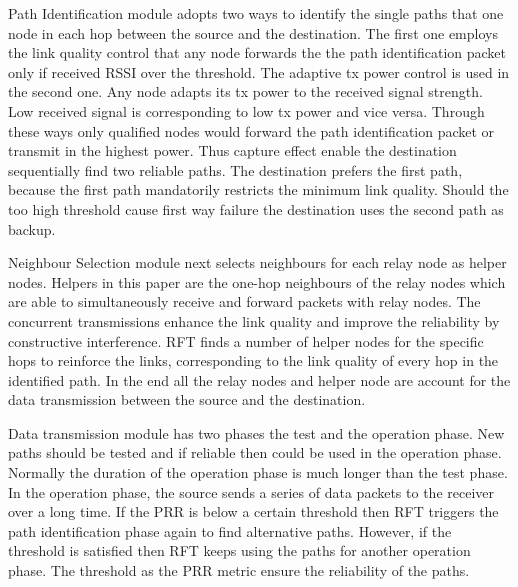 \documentclass[conference]{IEEEtran}
\begin{document}
Path Identification module adopts two ways to identify the single paths that one node in each hop between the source and the destination. The first one employs the link quality control that any node forwards the the path identification packet only if received RSSI over the threshold. The adaptive tx power control is used in the second one. Any node adapts its tx power to the received signal strength. Low received signal is corresponding to low tx power and vice versa. Through these ways only qualified nodes would forward the path identification packet or transmit in the highest power. Thus capture effect enable the destination sequentially find two reliable paths. The destination prefers the first path, because the first path mandatorily restricts the minimum link quality. Should the too high threshold cause first way failure the destination uses the second path as backup.

Neighbour Selection module next selects neighbours for each relay node as helper nodes. Helpers in this paper are the one-hop neighbours of the relay nodes which are able to simultaneously receive and forward packets with relay nodes. The concurrent transmissions enhance the link quality and improve the reliability by constructive interference. RFT finds a number of helper nodes for the specific hops to reinforce the links, corresponding to the link quality of every hop in the identified path. In the end all the relay nodes and helper node are account for the data transmission between the source and the destination.

Data transmission module has two phases the test and the operation phase. New paths should be tested and if reliable then could be used in the operation phase. Normally the duration of the operation phase is much longer than the test phase. In the operation phase, the source sends a series of data packets to the receiver over a long time. If the PRR is below a certain threshold then RFT triggers the path identification phase again to find alternative paths. However, if the threshold is satisfied then RFT keeps using the paths for another operation phase. The threshold as the PRR metric ensure the reliability of the paths. 
\end{document}
